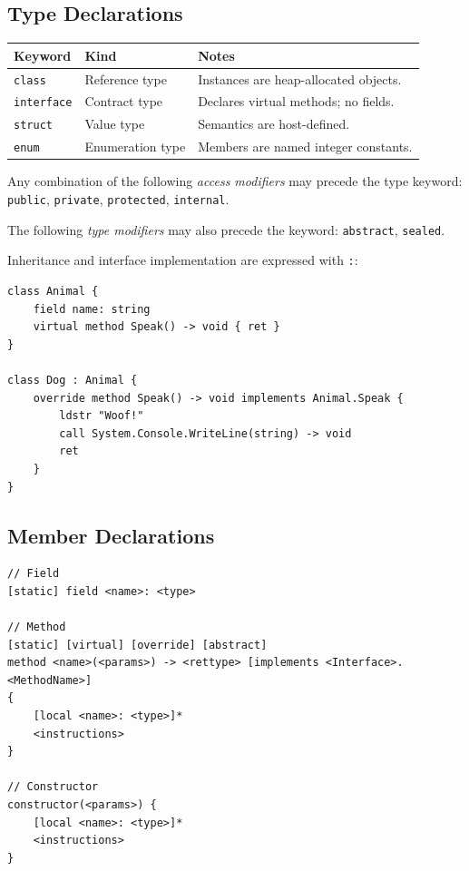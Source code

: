 \documentclass[11pt,a4paper]{article}
\newcommand{\term}[1]{\texttt{#1}}
\begin{document}
\subsection{Type Declarations}

\begin{center}
\begin{tabular}{lll}
  \toprule
  \textbf{Keyword}   & \textbf{Kind}      & \textbf{Notes} \\
  \midrule
  \term{class}     & Reference type   & Instances are heap-allocated objects. \\
  \term{interface} & Contract type    & Declares virtual methods; no fields. \\
  \term{struct}    & Value type       & Semantics are host-defined. \\
  \term{enum}      & Enumeration type & Members are named integer constants. \\
  \bottomrule
\end{tabular}
\end{center}

Any combination of the following \emph{access modifiers} may precede the
type keyword: \term{public}, \term{private}, \term{protected},
\term{internal}.

The following \emph{type modifiers} may also precede the keyword:
\term{abstract}, \term{sealed}.

Inheritance and interface implementation are expressed with \term{:}:

\begin{lstlisting}[style=textir]
class Animal {
    field name: string
    virtual method Speak() -> void { ret }
}

class Dog : Animal {
    override method Speak() -> void implements Animal.Speak {
        ldstr "Woof!"
        call System.Console.WriteLine(string) -> void
        ret
    }
}
\end{lstlisting}

\subsection{Member Declarations}

\begin{lstlisting}[style=textir]
// Field
[static] field <name>: <type>

// Method
[static] [virtual] [override] [abstract]
method <name>(<params>) -> <rettype> [implements <Interface>.<MethodName>]
{
    [local <name>: <type>]*
    <instructions>
}

// Constructor
constructor(<params>) {
    [local <name>: <type>]*
    <instructions>
}
\end{lstlisting}
\end{document}
